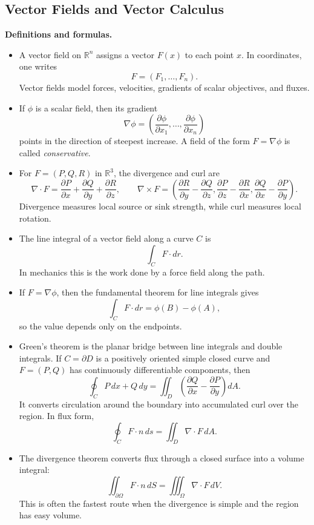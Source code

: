 \documentclass[11pt]{article}
\theoremstyle{definition}
\newcommand{\R}{\mathbb{R}}
\begin{document}
\subsection{Vector Fields and Vector Calculus}
\textbf{Definitions and formulas.}
\begin{itemize}
    \item A vector field on $\R^n$ assigns a vector $F(x)$ to each point $x$. In coordinates, one writes
    \[
        F=(F_1,\dots,F_n).
    \]
    Vector fields model forces, velocities, gradients of scalar objectives, and fluxes.
    \item If $\phi$ is a scalar field, then its gradient
    \[
        \nabla \phi = \left(\frac{\partial \phi}{\partial x_1},\dots,\frac{\partial \phi}{\partial x_n}\right)
    \]
    points in the direction of steepest increase. A field of the form $F=\nabla \phi$ is called \emph{conservative}.
    \item For $F=(P,Q,R)$ in $\R^3$, the divergence and curl are
    \[
        \nabla\cdot F = \frac{\partial P}{\partial x}+\frac{\partial Q}{\partial y}+\frac{\partial R}{\partial z},
        \qquad
        \nabla\times F=
        \left(
        \frac{\partial R}{\partial y}-\frac{\partial Q}{\partial z},
        \frac{\partial P}{\partial z}-\frac{\partial R}{\partial x},
        \frac{\partial Q}{\partial x}-\frac{\partial P}{\partial y}
        \right).
    \]
    Divergence measures local source or sink strength, while curl measures local rotation.
    \item The line integral of a vector field along a curve $C$ is
    \[
        \int_C F\cdot dr.
    \]
    In mechanics this is the work done by a force field along the path.
    \item If $F=\nabla \phi$, then the fundamental theorem for line integrals gives
    \[
        \int_C F\cdot dr = \phi(B)-\phi(A),
    \]
    so the value depends only on the endpoints.
    \item Green's theorem is the planar bridge between line integrals and double integrals. If $C=\partial D$ is a positively oriented simple closed curve and $F=(P,Q)$ has continuously differentiable components, then
    \[
        \oint_C P\,dx+Q\,dy = \iint_D \left(\frac{\partial Q}{\partial x}-\frac{\partial P}{\partial y}\right)dA.
    \]
    It converts circulation around the boundary into accumulated curl over the region. In flux form,
    \[
        \oint_C F\cdot n\,ds = \iint_D \nabla\cdot F\,dA.
    \]
    \item The divergence theorem converts flux through a closed surface into a volume integral:
    \[
        \iint_{\partial \Omega} F\cdot n\,dS = \iiint_{\Omega} \nabla\cdot F\,dV.
    \]
    This is often the fastest route when the divergence is simple and the region has easy volume.
\end{itemize}
\end{document}
